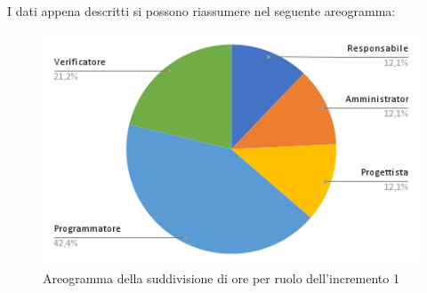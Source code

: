 \pagebreak
I dati appena descritti si possono riassumere nel seguente areogramma:
\begin{figure}[!h]
    \vspace{5px}
    \includegraphics[scale=0.5]{../../../Images/Diagrammi/Diagramma a torta/areogrammaIncremento14.png}
    \centering
    \caption{Areogramma della suddivisione di ore per ruolo dell'incremento 1}
\end{figure}

